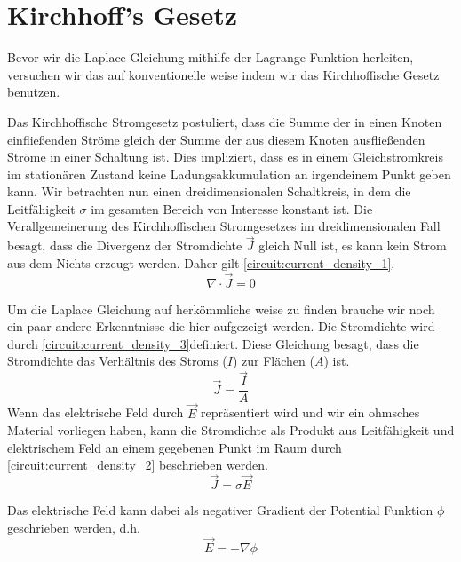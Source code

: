 %
%
%
%
\section{Kirchhoff's Gesetz
\label{circuit:section:teil1}}
Bevor wir die Laplace Gleichung mithilfe der Lagrange-Funktion herleiten, versuchen wir das auf konventionelle weise indem wir  das Kirchhoffische Gesetz benutzen. 

Das Kirchhoffische Stromgesetz postuliert, dass die Summe der in einen Knoten einfließenden Ströme gleich der Summe der aus diesem Knoten ausfließenden Ströme in einer Schaltung ist. Dies impliziert, dass es in einem Gleichstromkreis im stationären Zustand keine Ladungsakkumulation an irgendeinem Punkt geben kann. Wir betrachten nun einen dreidimensionalen Schaltkreis, in dem die Leitfähigkeit $\sigma$ im gesamten Bereich von Interesse konstant ist. Die Verallgemeinerung des Kirchhoffischen Stromgesetzes im dreidimensionalen Fall besagt, dass die Divergenz der Stromdichte $\vec{J}$ gleich Null ist, es kann kein Strom aus dem Nichts erzeugt werden. Daher gilt \autoref{circuit:current_density_1}.
\begin{equation}
	\nabla \cdot  \vec{J}=0
	\label{circuit:current_density_1}
\end{equation}

Um die Laplace Gleichung auf herkömmliche weise zu finden brauche wir noch ein paar andere Erkenntnisse die hier aufgezeigt werden. Die Stromdichte wird durch \autoref{circuit:current_density_3}definiert. Diese Gleichung besagt, dass die Stromdichte das Verhältnis des Stroms ($I$) zur Flächen ($A$) ist. 
\begin{equation}
\vec{J}=\frac{\vec{I}}{A}
	\label{circuit:current_density_3}
\end{equation}
Wenn das elektrische Feld durch $\vec{E}$ repräsentiert wird und wir ein ohmsches Material vorliegen haben, kann die Stromdichte als Produkt aus Leitfähigkeit und elektrischem Feld an einem gegebenen Punkt im Raum durch \autoref{circuit:current_density_2} beschrieben werden.
\begin{equation}
\vec{J}=\sigma \vec{E}
\label{circuit:current_density_2}
\end{equation}


Das elektrische Feld kann dabei als negativer Gradient der Potential Funktion $\phi$ geschrieben werden, d.h.
\begin{equation}
\vec{E}=-\nabla \phi
\label{circuit:current_density_4}
\end{equation}

